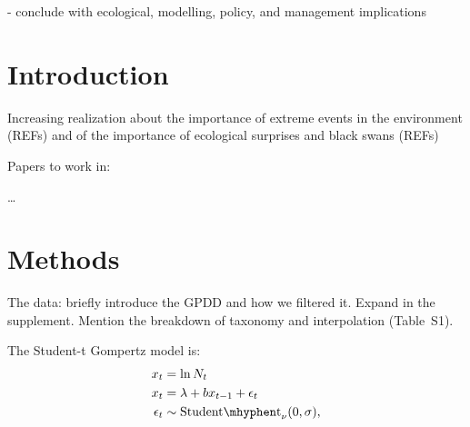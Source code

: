 \documentclass[11pt]{article}
\begin{document}
- conclude with ecological, modelling, policy, and management implications

\section{Introduction}

Increasing realization about the importance of extreme events in the environment (REFs)
and of the importance of ecological surprises and black swans (REFs)

Papers to work in:

\citep{inchausti2002,halley2002,inchausti2001}

\citep{jentsch2007}

\citep{ward2007}

\citep{garcia-carreras2011}
\citep{sornette2009}

\citep{nunez2012}

\citep{thompson2013}
\citep{beaugrand2012}
\citep{pine-iii2009}

\citep{doak2008}

\citep{smale2013}

\citep{easterling2000}
\citep{scheffer2003}
\citep{katz2005}

\citep{taleb2007}

\citep{vasseur2014}

\citep{vert-pre2013}
\citep{lindenmayer2010}

\citep{valpine2002} 
\citep{gregory2010}
\citet{garcia-carreras2011}
\citet{brook2006}
\citep{herrandoprez2014}

\citep{sibly2005, ziebarth2010}

\ldots

\section{Methods}

The data: briefly introduce the GPDD and how we filtered it. Expand in the supplement. Mention the breakdown of taxonomy and interpolation (Table~S1).

The Student-t Gompertz model is:
\begin{align*}
x_t &= \ln N_t\\
x_t &= \lambda + b x_{t-1} + \epsilon_t\\
\epsilon_t &\sim \mathrm{Student\mhyphen t}_\nu(0, \sigma),
\end{align*}
\end{document}
